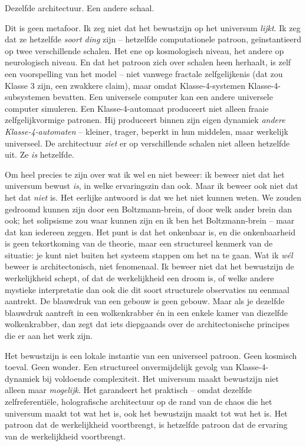 \documentclass[11pt, twoside, openright]{book}
\begin{document}
Dezelfde architectuur. Een andere schaal.

Dit is geen metafoor. Ik zeg niet dat het bewustzijn op het universum \textit{lijkt}. Ik zeg dat ze hetzelfde \textit{soort ding} zijn -- hetzelfde computationele patroon, geïnstantieerd op twee verschillende schalen. Het ene op kosmologisch niveau, het andere op neurologisch niveau. En dat het patroon zich over schalen heen herhaalt, is zelf een voorspelling van het model -- niet vanwege fractale zelfgelijkenis (dat zou Klasse 3 zijn, een zwakkere claim), maar omdat Klasse-4-systemen Klasse-4-subsystemen bevatten. Een universele computer kan een andere universele computer simuleren. Een Klasse-4-automaat produceert niet alleen fraaie zelfgelijkvormige patronen. Hij produceert binnen zijn eigen dynamiek \textit{andere Klasse-4-automaten} -- kleiner, trager, beperkt in hun middelen, maar werkelijk universeel. De architectuur \textit{ziet} er op verschillende schalen niet alleen hetzelfde uit. Ze \textit{is} hetzelfde.

Om heel precies te zijn over wat ik wel en niet beweer: ik beweer niet dat het universum bewust \textit{is}, in welke ervaringszin dan ook. Maar ik beweer ook niet dat het dat \textit{niet} is. Het eerlijke antwoord is dat we het niet kunnen weten. We zouden gedroomd kunnen zijn door een Boltzmann-brein, of door welk ander brein dan ook; het solipsisme zou waar kunnen zijn en ik ben het Boltzmann-brein -- maar dat kan iedereen zeggen. Het punt is dat het onkenbaar is, en die onkenbaarheid is geen tekortkoming van de theorie, maar een structureel kenmerk van de situatie: je kunt niet buiten het systeem stappen om het na te gaan. Wat ik \textit{wél} beweer is architectonisch, niet fenomenaal. Ik beweer niet dat het bewustzijn de werkelijkheid schept, of dat de werkelijkheid een droom is, of welke andere mystieke interpretatie dan ook die dit soort structurele observaties nu eenmaal aantrekt. De blauwdruk van een gebouw is geen gebouw. Maar als je dezelfde blauwdruk aantreft in een wolkenkrabber én in een enkele kamer van diezelfde wolkenkrabber, dan zegt dat iets diepgaands over de architectonische principes die er aan het werk zijn.

Het bewustzijn is een lokale instantie van een universeel patroon. Geen kosmisch toeval. Geen wonder. Een structureel onvermijdelijk gevolg van Klasse-4-dynamiek bij voldoende complexiteit. Het universum maakt bewustzijn niet alleen maar \textit{mogelijk}. Het garandeert het praktisch -- omdat dezelfde zelfreferentiële, holografische architectuur op de rand van de chaos die het universum maakt tot wat het is, ook het bewustzijn maakt tot wat het is. Het patroon dat de werkelijkheid voortbrengt, is hetzelfde patroon dat de ervaring van de werkelijkheid voortbrengt.
\end{document}
